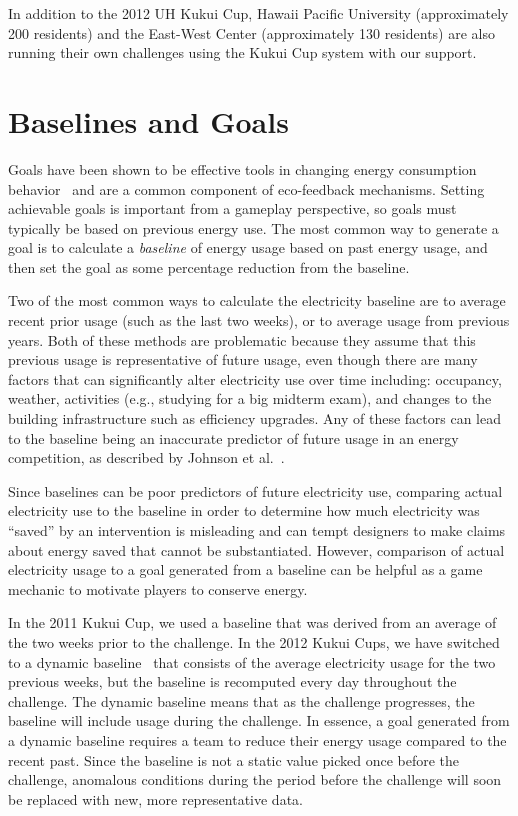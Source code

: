 \documentclass{sigchi}
\begin{document}
In addition to the 2012 UH Kukui Cup, Hawaii Pacific University (approximately 200 residents) and the East-West Center (approximately 130 residents) are also running their own challenges using the Kukui Cup system with our support.

\section{Baselines and Goals}
\label{sec:goals-baselines}

Goals have been shown to be effective tools in changing energy consumption behavior~\cite{Becker78, Houwelingen89} and are a common component of eco-feedback mechanisms. Setting achievable goals is important from a gameplay perspective, so goals must typically be based on previous energy use. The most common way to generate a goal is to calculate a \emph{baseline} of energy usage based on past energy usage, and then set the goal as some percentage reduction from the baseline.

Two of the most common ways to calculate the electricity baseline are to average recent prior usage (such as the last two weeks), or to average usage from previous years. Both of these methods are problematic because they assume that this previous usage is representative of future usage, even though there are many factors that can significantly alter electricity use over time including: occupancy, weather, activities (e.g., studying for a big midterm exam), and changes to the building infrastructure such as efficiency upgrades. Any of these factors can lead to the baseline being an inaccurate predictor of future usage in an energy competition, as described by Johnson et al.~\cite{csdl2-12-08}.

Since baselines can be poor predictors of future electricity use, comparing actual electricity use to the baseline in order to determine how much electricity was ``saved'' by an intervention is misleading and can tempt designers to make claims about energy saved that cannot be substantiated. However, comparison of actual electricity usage to a goal generated from a baseline can be helpful as a game mechanic to motivate players to conserve energy.

In the 2011 Kukui Cup, we used a baseline that was derived from an average of the two weeks prior to the challenge. In the 2012 Kukui Cups, we have switched to a dynamic baseline~\cite{csdl2-12-08} that consists of the average electricity usage for the two previous weeks, but the baseline is recomputed every day throughout the challenge. The dynamic baseline means that as the challenge progresses, the baseline will include usage during the challenge. In essence, a goal generated from a dynamic baseline requires a team to reduce their energy usage compared to the recent past. Since the baseline is not a static value picked once before the challenge, anomalous conditions during the period before the challenge will soon be replaced with new, more representative data.
\end{document}
